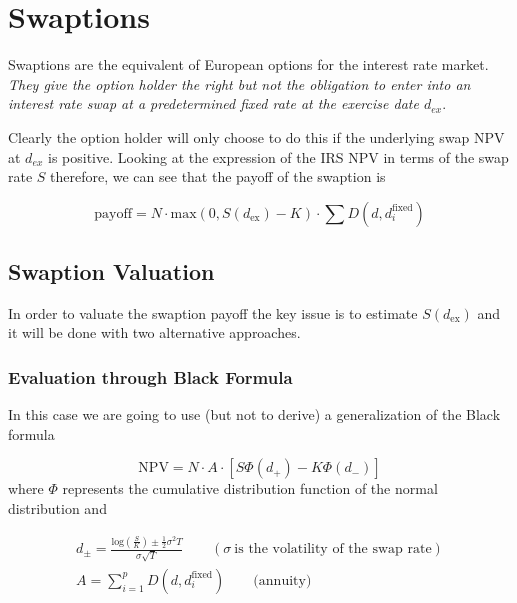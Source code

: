 \section{Swaptions}
\label{interest-rate-swaptions}

Swaptions are the equivalent of European options for the interest rate market. \emph{They give the option holder the right but not the obligation to enter into an interest rate swap at a predetermined fixed rate at the exercise date $d_{ex}$}.

Clearly the option holder will only choose to do this if the underlying swap NPV at $d_{ex}$ is positive. Looking at the expression of the IRS NPV in terms of the swap rate $S$ therefore, we can see that the payoff of the swaption is

\begin{equation}
\mathrm{payoff} = N\cdot \mathrm{max}(0, S(d_{\mathrm{ex}}) - K)\cdot\sum D(d, d_i^{\mathrm{fixed}})
\label{eq:swaption_payoff}
\end{equation}

\subsection{Swaption Valuation}

In order to valuate the swaption payoff the key issue is to estimate $S(d_{\mathrm{ex}})$ and it will be done with two alternative approaches.

\subsubsection{Evaluation through Black Formula}
\label{evaluation-through-black-scholes-formula}

In this case we are going to use (but not to derive) a generalization of the Black formula

\begin{equation}
\mathrm{NPV} = N\cdot A\cdot [S \Phi(d_+) - K\Phi(d_-)]
\end{equation}
where $\Phi$ represents the cumulative distribution function of the normal distribution and

\begin{equation}
\begin{gathered}
d_{\pm} = \frac{\mathrm{log}(\frac{S}{K}) \pm \frac{1}{2}\sigma^{2}T}{\sigma\sqrt{T}}\qquad(\sigma~\textrm{is the volatility of the swap rate})\\
A = \sum_{i=1}^{p}D(d, d_{i}^{\mathrm{fixed}})\qquad\mathrm{(annuity})
\end{gathered}
\end{equation}


